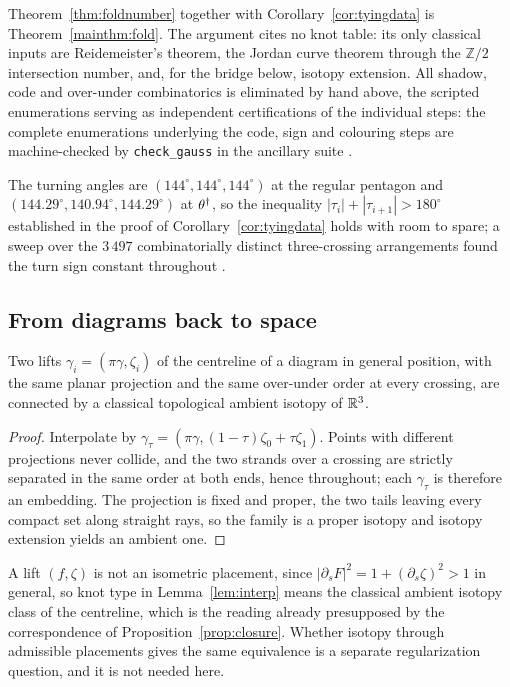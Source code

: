 Theorem~\ref{thm:foldnumber} together with Corollary~\ref{cor:tyingdata} is Theorem~\ref{mainthm:fold}. The argument cites no knot table: its only classical inputs are Reidemeister's theorem, the Jordan curve theorem through the $\mathbb Z/2$ intersection number, and, for the bridge below, isotopy extension. All shadow, code and over-under combinatorics is eliminated by hand above, the scripted enumerations serving as independent certifications of the individual steps: the complete enumerations underlying the code, sign and colouring steps are machine-checked by \texttt{check\_gauss} in the ancillary suite \cite{anc}.

\begin{remark}\label{rem:turns}
The turning angles are $(144^\circ,144^\circ,144^\circ)$ at the regular pentagon and $(144.29^\circ,140.94^\circ,144.29^\circ)$ at $\theta^\dagger$, so the inequality $|\tau_i|+|\tau_{i+1}|>180^\circ$ established in the proof of Corollary~\ref{cor:tyingdata} holds with room to spare; a sweep over the $3\,497$ combinatorially distinct three-crossing arrangements found the turn sign constant throughout \cite{anc}.
\end{remark}

\subsection{From diagrams back to space}

\begin{lemma}\label{lem:interp}
Two lifts $\gamma_i=(\pi\gamma,\zeta_i)$ of the centreline of a diagram in general position, with the same planar projection and the same over-under order at every crossing, are connected by a classical topological ambient isotopy of $\mathbb{R}^3$.
\end{lemma}

\begin{proof}
Interpolate by $\gamma_\tau=(\pi\gamma,(1-\tau)\zeta_0+\tau\zeta_1)$. Points with different projections never collide, and the two strands over a crossing are strictly separated in the same order at both ends, hence throughout; each $\gamma_\tau$ is therefore an embedding. The projection is fixed and proper, the two tails leaving every compact set along straight rays, so the family is a proper isotopy and isotopy extension yields an ambient one.
\end{proof}

A lift $(f,\zeta)$ is not an isometric placement, since $|\partial_sF|^2=1+(\partial_s\zeta)^2>1$ in general, so knot type in Lemma~\ref{lem:interp} means the classical ambient isotopy class of the centreline, which is the reading already presupposed by the correspondence of Proposition~\ref{prop:closure}. Whether isotopy through admissible placements gives the same equivalence is a separate regularization question, and it is not needed here.

